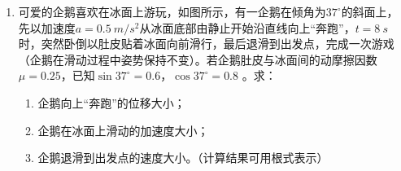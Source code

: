 \begin{enumerate}
\item 
{}
可爱的企鹅喜欢在冰面上游玩，如图所示，有一企鹅在倾角为$ 37 ^{\circ} $的斜面上，先以加速度$ a=0.5 \ m/s ^{2} $从冰面底部由静止开始沿直线向上“奔跑”，$ t=8 \ s $时，突然卧倒以肚皮贴着冰面向前滑行，最后退滑到出发点，完成一次游戏（企鹅在滑动过程中姿势保持不变）。若企鹅肚皮与冰面间的动摩擦因数$ \mu =0.25 $，已知$ \sin 37 ^{\circ} =0.6 $，$ \cos 37 ^{\circ} =0.8 $ 。求：
\begin{enumerate}
\renewcommand{\labelenumi}{\arabic{enumi}.}
\item
企鹅向上“奔跑”的位移大小；
\item 
企鹅在冰面上滑动的加速度大小；
\item 
企鹅退滑到出发点的速度大小。（计算结果可用根式表示）

\end{enumerate}










\end{enumerate}




